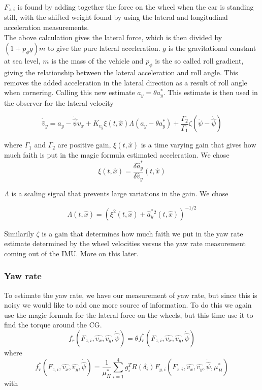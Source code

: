 $F_{z,i}$ is found by adding together the force on the wheel when the car is standing still, with the shifted weight found by using the lateral and longitudinal acceleration measurements.  \\

The above calculation gives the lateral force, which is then divided by $(1 + p_{\phi}g)m$ to give the pure lateral acceleration. $g$ is the gravitational constant at sea level, $m$ is the mass of the vehicle and $p_{\phi}$ is the so called roll gradient, giving the relationship between the lateral acceleration and roll angle. This removes the added acceleration in the lateral direction as a result of roll angle when cornering. Calling this new estimate $a_y = \theta a_y^*$. This estimate is then used in the observer for the lateral velocity

\begin{equation}
    \dot{\hat{v}}_y = a_y - \dot{\hat{\psi}}\hat{v}_x + K_{v_y}\xi(t,\hat{x})\Lambda(a_y - \theta a_y^{*}) + \frac{\Gamma_2}{\Gamma_1}\zeta(\dot{\psi} - \dot{\hat{\psi}})
\end{equation}

where $\Gamma_1$ and $\Gamma_2$ are positive gain, $\xi(t,\hat{x})$ is a time varying gain that gives how much faith is put in the magic formula estimated acceleration. We chose
\begin{equation}
    \xi(t,\hat{x}) = \frac{\delta \hat{a}_y^*}{\delta \hat{v}_y}(t,\hat{x})
\end{equation}

$\Lambda$ is a scaling signal that prevents large variations in the gain. We chose

\begin{equation}
    \Lambda(t,\hat{x}) = (\xi^2(t,\hat{x}) + \hat{a}_y^*^2(t,\hat{x}))^{-1/2}
\end{equation}

Similarily $\zeta$ is a gain that determines how much faith we put in the yaw rate estimate determined by the wheel velocities versus the yaw rate measurement coming out of the IMU. More on this later. 

\subsubsection{Yaw rate}

To estimate the yaw rate, we have our measurement of yaw rate, but since this is noisy we would like to add one more source of information. To do this we again use the magic formula for the lateral force on the wheels, but this time use it to find the torque around the CG.
\begin{equation}
    f_r(F_{z,i}, \hat{v_x}, \hat{v_y}, \dot{\hat{\psi}}) =\theta f_r^*(F_{z,i}, \hat{v_x}, \hat{v_y}, \dot{\hat{\psi}}) 
\end{equation}
where
\begin{equation}
    f_r^*(F_{z,i}, \hat{v_x}, \hat{v_y}, \dot{\hat{\psi}}) = \frac{1}{\mu_H^*}\sum_{i=1}^{4}g_i^TR(\delta_i)F_{y,i}(F_{z,i}, \hat{v_x}, \hat{v_y}, \dot{\hat{\psi}}, \mu_H^*)
\end{equation}
with 

